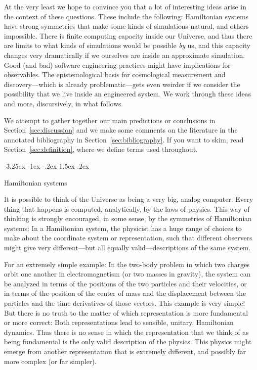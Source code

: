\documentclass[12pt,letterpaper]{article}
\makeatletter
\renewcommand\section{\@startsection {section}{1}{\z@}%
  {-3.25ex \@plus -1ex \@minus -.2ex}%
  {1.5ex \@plus .2ex}%
  {\raggedright\normalfont\large\bfseries}}
\newcommand{\sectionname}{Section}
\newcommand{\secref}[1]{\sectionname~\ref{#1}}
\makeatother
\begin{document}
At the very least we hope to convince you that a lot of interesting ideas arise in the context of these questions.
These include the following:
Hamiltonian systems have strong symmetries that make some kinds of simulations natural, and others impossible.
There is finite computing capacity inside our Universe, and thus there are limits to what kinds of simulations would be possible \emph{by} us, and this capacity changes very dramatically if we ourselves are inside an approximate simulation.
Good (and bad) software engineering practices might have implications for observables.
The epistemological basis for cosmological measurement and discovery---which is already problematic---gets even weirder if we consider the possibility that we live inside an engineered system.
We work through these ideas and more, discursively, in what follows.

We attempt to gather together our main predictions or conclusions in \secref{sec:discussion} and we make some comments on the literature in the annotated bibliography in \secref{sec:bibliography}.
If you want to skim, read \sectionname~\ref{sec:definition}, where we define terms used throughout.

\section{Hamiltonian systems}

It is possible to think of the Universe as being a very big, analog computer.
Every thing that happens is computed, analytically, by the laws of physics.
This way of thinking is strongly encouraged, in some sense, by the symmetries of Hamiltonian systems:
In a Hamiltonian system, the physicist has a huge range of choices to make about the coordinate system or representation, such that different observers might give very different---but all equally valid---descriptions of the same system.

For an extremely simple example: In the two-body problem in which two charges orbit one another in electromagnetism (or two masses in gravity), the system can be analyzed in terms of the positions of the two particles and their velocities, or in terms of the position of the center of mass and the displacement between the particles and the time derivatives of those vectors.
This example is very simple!
But there is no truth to the matter of which representation is more fundamental or more correct:
Both representations lead to sensible, unitary, Hamiltonian dynamics.
Thus there is no sense in which the representation that we think of as being fundamental is the only valid description of the physics.
This physics might emerge from another representation that is extremely different, and possibly far more complex (or far simpler).
\end{document}
